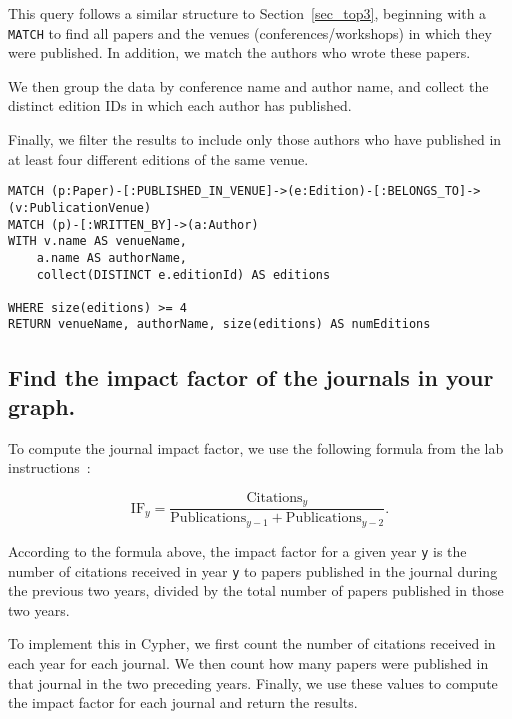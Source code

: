 \documentclass{article}
\begin{document}
This query follows a similar structure to Section~\ref{sec_top3}, beginning with a \texttt{MATCH} to find all papers and the venues (conferences/workshops) in which they were published. In addition, we match the authors who wrote these papers.

We then group the data by conference name and author name, and collect the distinct edition IDs in which each author has published. 

Finally, we filter the results to include only those authors who have published in at least four different editions of the same venue.

\begin{verbatim}
MATCH (p:Paper)-[:PUBLISHED_IN_VENUE]->(e:Edition)-[:BELONGS_TO]->(v:PublicationVenue)
MATCH (p)-[:WRITTEN_BY]->(a:Author)
WITH v.name AS venueName, 
    a.name AS authorName, 
    collect(DISTINCT e.editionId) AS editions
                 
WHERE size(editions) >= 4
RETURN venueName, authorName, size(editions) AS numEditions
\end{verbatim}

\subsection{Find the impact factor of the journals in your graph.}

To compute the journal impact factor, we use the following formula from the lab instructions~\cite{wikipediacontributors_2020_impact}:

\[
\mathrm{IF}_y = \frac{\mathrm{Citations}_y}{\mathrm{Publications}_{y-1} + \mathrm{Publications}_{y-2}}.
\]

According to the formula above, the impact factor for a given year \texttt{y} is the number of citations received in year \texttt{y} to papers published in the journal during the previous two years, divided by the total number of papers published in those two years.

To implement this in Cypher, we first count the number of citations received in each year for each journal. We then count how many papers were published in that journal in the two preceding years. Finally, we use these values to compute the impact factor for each journal and return the results.
\end{document}
